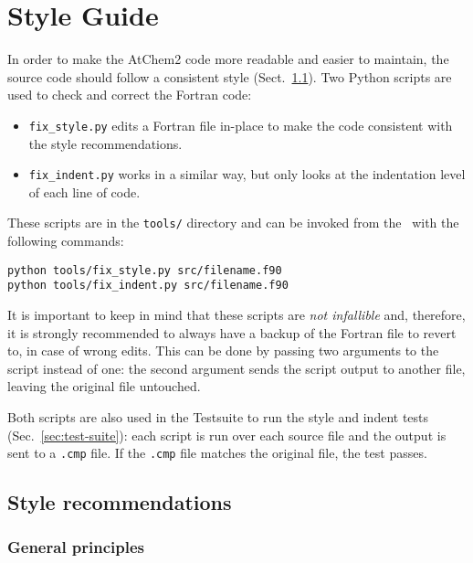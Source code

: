 \section{Style Guide} \label{sec:style-guide}

In order to make the AtChem2 code more readable and easier to
maintain, the source code should follow a consistent style
(Sect.~\ref{subsec:style-recommendations}). Two Python scripts are used
to check and correct the Fortran code:

\begin{itemize}
\item \texttt{fix\_style.py} edits a Fortran file in-place to make the
  code consistent with the style recommendations.
\item \texttt{fix\_indent.py} works in a similar way, but only looks
  at the indentation level of each line of code.
\end{itemize}

These scripts are in the \texttt{tools/} directory and can be invoked
from the \maindir\ with the following commands:

\begin{verbatim}
python tools/fix_style.py src/filename.f90
python tools/fix_indent.py src/filename.f90
\end{verbatim}

It is important to keep in mind that these scripts are \emph{not
  infallible} and, therefore, it is strongly recommended to always
have a backup of the Fortran file to revert to, in case of wrong
edits. This can be done by passing two arguments to the script instead
of one: the second argument sends the script output to another file,
leaving the original file untouched.

Both scripts are also used in the Testsuite to run the style and
indent tests (Sec.~\ref{sec:test-suite}): each script is run over each
source file and the output is sent to a \texttt{.cmp} file. If the
\texttt{.cmp} file matches the original file, the test passes.

\subsection{Style recommendations} \label{subsec:style-recommendations}

\subsubsection{General principles}

